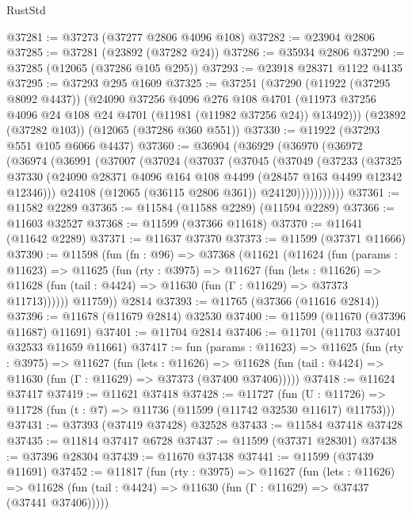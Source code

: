 \begin{lexlean}{RustStd}
\begin{coremodule}
@37281 := @37273 (@37277 @2806 @4096 @108)
@37282 := @23904 @2806
@37285 := @37281 (@23892 (@37282 @24))
@37286 := @35934 @2806
@37290 := @37285 (@12065 (@37286 @105 @295))
@37293 := @23918 @28371 @1122 @4135
@37295 := @37293 @295 @1609
@37325 := @37251
    (@37290
      (@11922 (@37295 @8092 @4437))
      (@24090
        @37256
        @4096
        @276
        @108
        @4701
        (@11973 @37256 @4096 @24 @108 @24 @4701 (@11981 (@11982 @37256 @24)) @13492)))
    (@23892 (@37282 @103))
    (@12065 (@37286 @360 @551))
@37330 := @11922 (@37293 @551 @105 @6066 @4437)
@37360 := @36904
    (@36929
      (@36970
        (@36972
          (@36974
            (@36991
              (@37007
                (@37024
                  (@37037
                    (@37045
                      (@37049
                        (@37233
                          (@37325
                            @37330
                            (@24090 @28371 @4096 @164 @108 @4499 (@28457 @163 @4499 @12342 @12346)))
                          @24108
                          (@12065 (@36115 @2806 @361))
                          @24120)))))))))))
@37361 := @11582 @2289
@37365 := @11584 (@11588 @2289) (@11594 @2289)
@37366 := @11603 @32527
@37368 := @11599 (@37366 @11618)
@37370 := @11641 (@11642 @2289)
@37371 := @11637 @37370
@37373 := @11599 (@37371 @11666)
@37390 := @11598
    (fun (fn : @96) =>
    @37368
      (@11621
        (@11624
          (fun (params : @11623) =>
          @11625
            (fun (rty : @3975) =>
            @11627
              (fun (lets : @11626) =>
              @11628 (fun (tail : @4424) => @11630 (fun (Γ : @11629) => @37373 @11713))))))
        @11759))
    @2814
@37393 := @11765 (@37366 (@11616 @2814))
@37396 := @11678 (@11679 @2814) @32530
@37400 := @11599 (@11670 (@37396 @11687) @11691)
@37401 := @11704 @2814
@37406 := @11701 (@11703 @37401 @32533 @11659 @11661)
@37417 := fun (params : @11623) =>
  @11625
    (fun (rty : @3975) =>
    @11627
      (fun (lets : @11626) =>
      @11628 (fun (tail : @4424) => @11630 (fun (Γ : @11629) => @37373 (@37400 @37406)))))
@37418 := @11624 @37417
@37419 := @11621 @37418
@37428 := @11727
    (fun (U : @11726) => @11728 (fun (t : @7) => @11736 (@11599 (@11742 @32530 @11617) @11753)))
@37431 := @37393 (@37419 @37428) @32528
@37433 := @11584 @37418 @37428
@37435 := @11814 @37417 @6728
@37437 := @11599 (@37371 @28301)
@37438 := @37396 @28304
@37439 := @11670 @37438
@37441 := @11599 (@37439 @11691)
@37452 := @11817
    (fun (rty : @3975) =>
    @11627
      (fun (lets : @11626) =>
      @11628 (fun (tail : @4424) => @11630 (fun (Γ : @11629) => @37437 (@37441 @37406)))))

\end{coremodule}
\end{lexlean}
